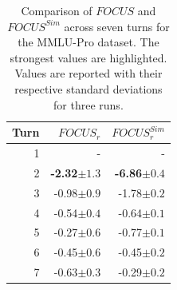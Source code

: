 \begin{table}[t]
\centering
\small
\begin{tabular}{r|rr}
\toprule
\textbf{Turn} & \textbf{$FOCUS_{r}$} & \textbf{$FOCUS^{Sim}_{r}$} \\
\midrule
1 & - & - \\
2 & \textbf{-2.32\tiny{$\pm 1.3$}} & \textbf{-6.86\tiny{$\pm 0.4$}} \\
3 & -0.98\tiny{$\pm 0.9$} & -1.78\tiny{$\pm 0.2$} \\
4 & -0.54\tiny{$\pm 0.4$} & -0.64\tiny{$\pm 0.1$} \\
5 & -0.27\tiny{$\pm 0.6$} & -0.77\tiny{$\pm 0.1$} \\
6 & -0.45\tiny{$\pm 0.6$} & -0.45\tiny{$\pm 0.2$} \\
7 & -0.63\tiny{$\pm 0.3$} & -0.29\tiny{$\pm 0.2$} \\
\bottomrule
\end{tabular}
\caption{Comparison of $FOCUS$ and $FOCUS^{Sim}$ across seven turns for the MMLU-Pro dataset. The strongest values are highlighted. Values are reported with their respective standard deviations for three runs.}
\label{tab:compare_focus_variants}
\end{table}
